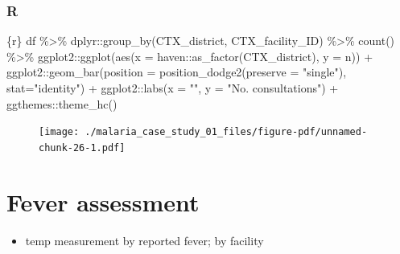 \documentclass[
  letterpaper,
  DIV=11,
  numbers=noendperiod,
  oneside]{scrreprt}
\newenvironment{Shaded}{\begin{snugshade}}{\end{snugshade}}
\newcommand{\AttributeTok}[1]{\textcolor[rgb]{0.40,0.45,0.13}{#1}}
\newcommand{\FunctionTok}[1]{\textcolor[rgb]{0.28,0.35,0.67}{#1}}
\newcommand{\InformationTok}[1]{\textcolor[rgb]{0.37,0.37,0.37}{#1}}
\newcommand{\NormalTok}[1]{\textcolor[rgb]{0.00,0.23,0.31}{#1}}
\newcommand{\SpecialCharTok}[1]{\textcolor[rgb]{0.37,0.37,0.37}{#1}}
\newcommand{\StringTok}[1]{\textcolor[rgb]{0.13,0.47,0.30}{#1}}
\providecommand{\tightlist}{%
  \setlength{\itemsep}{0pt}\setlength{\parskip}{0pt}}\usepackage{longtable,booktabs,array}
\begin{document}
\hypertarget{r-11}{%
\subsubsection{R}\label{r-11}}

\begin{Shaded}
\begin{Highlighting}[]
\InformationTok{\textasciigrave{}\textasciigrave{}\textasciigrave{}\{r\}}
\NormalTok{df }\SpecialCharTok{\%\textgreater{}\%}
\NormalTok{  dplyr}\SpecialCharTok{::}\FunctionTok{group\_by}\NormalTok{(CTX\_district,}
\NormalTok{                  CTX\_facility\_ID) }\SpecialCharTok{\%\textgreater{}\%}
  \FunctionTok{count}\NormalTok{() }\SpecialCharTok{\%\textgreater{}\%} 
\NormalTok{  ggplot2}\SpecialCharTok{::}\FunctionTok{ggplot}\NormalTok{(}\FunctionTok{aes}\NormalTok{(}\AttributeTok{x =}\NormalTok{ haven}\SpecialCharTok{::}\FunctionTok{as\_factor}\NormalTok{(CTX\_district),}
                      \AttributeTok{y =}\NormalTok{ n)) }\SpecialCharTok{+} 
\NormalTok{  ggplot2}\SpecialCharTok{::}\FunctionTok{geom\_bar}\NormalTok{(}\AttributeTok{position =} \FunctionTok{position\_dodge2}\NormalTok{(}\AttributeTok{preserve =} \StringTok{"single"}\NormalTok{),}
                    \AttributeTok{stat=}\StringTok{"identity"}\NormalTok{) }\SpecialCharTok{+}
\NormalTok{  ggplot2}\SpecialCharTok{::}\FunctionTok{labs}\NormalTok{(}\AttributeTok{x =} \StringTok{""}\NormalTok{, }\AttributeTok{y =} \StringTok{"No. consultations"}\NormalTok{) }\SpecialCharTok{+}
\NormalTok{  ggthemes}\SpecialCharTok{::}\FunctionTok{theme\_hc}\NormalTok{()}
\InformationTok{\textasciigrave{}\textasciigrave{}\textasciigrave{}}
\end{Highlighting}
\end{Shaded}

\begin{figure}[H]

{\centering \texttt{[image: ./malaria\_case\_study\_01\_files/figure-pdf/unnamed-chunk-26-1.pdf]}

}

\end{figure}

\hypertarget{fever-assessment}{%
\section{Fever assessment}\label{fever-assessment}}

\begin{itemize}
\tightlist
\item
  temp measurement by reported fever; by facility
\end{itemize}
\end{document}

